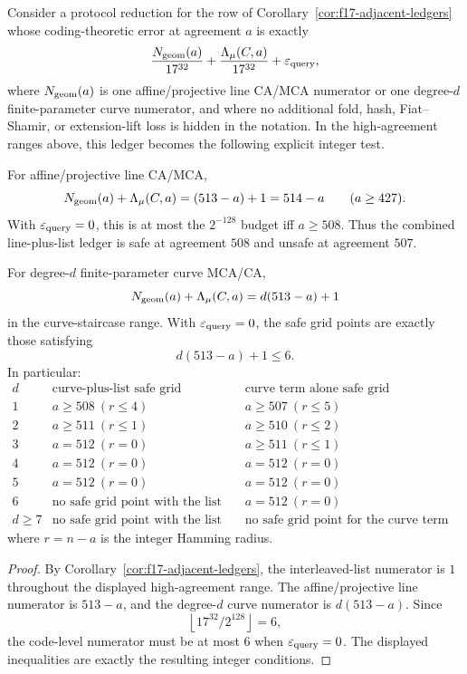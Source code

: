 \begin{corollary}
\label{cor:high-agreement-protocol-ledger}
Consider a protocol reduction for the row of
Corollary~\ref{cor:f17-adjacent-ledgers} whose coding-theoretic error at
agreement \(a\) is exactly
\[
  \frac{N_{\rm geom}(a)}{17^{32}}
  +
  \frac{\Lambda_\mu(C,a)}{17^{32}}
  +
  \varepsilon_{\rm query},
\]
where \(N_{\rm geom}(a)\) is one affine/projective line CA/MCA numerator or one
degree-\(d\) finite-parameter curve numerator, and where no additional fold,
hash, Fiat--Shamir, or extension-lift loss is hidden in the notation.  In the
high-agreement ranges above, this ledger becomes the following explicit integer
test.

For affine/projective line CA/MCA,
\[
  N_{\rm geom}(a)+\Lambda_\mu(C,a)
  =
  (513-a)+1
  =
  514-a
  \qquad (a\ge427).
\]
With \(\varepsilon_{\rm query}=0\), this is at most the \(2^{-128}\) budget iff
\(a\ge508\).  Thus the combined line-plus-list ledger is safe at agreement
\(508\) and unsafe at agreement \(507\).

For degree-\(d\) finite-parameter curve MCA/CA,
\[
  N_{\rm geom}(a)+\Lambda_\mu(C,a)
  =
  d(513-a)+1
\]
in the curve-staircase range.  With \(\varepsilon_{\rm query}=0\), the safe
grid points are exactly those satisfying
\[
  d(513-a)+1\le6 .
\]
In particular:
\[
\begin{array}{c|c|c}
d & \text{curve-plus-list safe grid} & \text{curve term alone safe grid}\\
\hline
1 & a\ge508\ (r\le4) & a\ge507\ (r\le5)\\
2 & a\ge511\ (r\le1) & a\ge510\ (r\le2)\\
3 & a=512\ (r=0) & a\ge511\ (r\le1)\\
4 & a=512\ (r=0) & a=512\ (r=0)\\
5 & a=512\ (r=0) & a=512\ (r=0)\\
6 & \text{no safe grid point with the list term} & a=512\ (r=0)\\
d\ge7 & \text{no safe grid point with the list term} &
        \text{no safe grid point for the curve term alone}
\end{array}
\]
where \(r=n-a\) is the integer Hamming radius.
\end{corollary}

\begin{proof}
By Corollary~\ref{cor:f17-adjacent-ledgers}, the interleaved-list numerator is
\(1\) throughout the displayed high-agreement range.  The affine/projective line
numerator is \(513-a\), and the degree-\(d\) curve numerator is \(d(513-a)\).
Since
\[
  \left\lfloor 17^{32}/2^{128}\right\rfloor=6,
\]
the code-level numerator must be at most \(6\) when
\(\varepsilon_{\rm query}=0\).  The displayed inequalities are exactly the
resulting integer conditions.
\end{proof}

